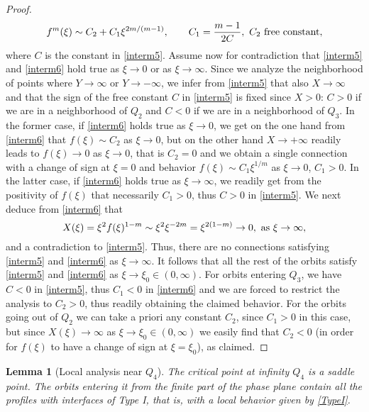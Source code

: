 \documentclass[a4paper,11pt]{article}
\newtheorem{lemma}[theorem]{Lemma}
\numberwithin{equation}{section}
\begin{document}
\begin{proof}
\begin{equation}\label{interm6}
f^m(\xi)\sim C_2+C_1\xi^{2m/(m-1)}, \qquad C_1=\frac{m-1}{2C}, \ C_2 \ {\rm free \ constant},
\end{equation}
where $C$ is the constant in \eqref{interm5}. Assume now for contradiction that \eqref{interm5} and \eqref{interm6} hold true as $\xi\to0$ or as $\xi\to\infty$. Since we analyze the neighborhood of points where $Y\to\infty$ or $Y\to-\infty$, we infer from \eqref{interm5} that also $X\to\infty$ and that the sign of the free constant $C$ in \eqref{interm5} is fixed since $X>0$: $C>0$ if we are in a neighborhood of $Q_2$ and $C<0$ if we are in a neighborhood of $Q_3$. In the former case, if \eqref{interm6} holds true as $\xi\to0$, we get on the one hand from \eqref{interm6} that $f(\xi)\sim C_2$ as $\xi\to0$, but on the other hand $X\to+\infty$ readily leads to $f(\xi)\to0$ as $\xi\to0$, that is $C_2=0$ and we obtain a single connection with a change of sign at $\xi=0$ and behavior $f(\xi)\sim C_1\xi^{1/m}$ as $\xi\to0$, $C_1>0$. In the latter case, if \eqref{interm6} holds true as $\xi\to\infty$, we readily get from the positivity of $f(\xi)$ that necessarily $C_1>0$, thus $C>0$ in \eqref{interm5}. We next deduce from \eqref{interm6} that
$$
X(\xi)=\xi^2f(\xi)^{1-m}\sim\xi^2\xi^{-2m}=\xi^{2(1-m)}\to0, \ {\rm as} \ \xi\to\infty,
$$
and a contradiction to \eqref{interm5}. Thus, there are no connections satisfying \eqref{interm5} and \eqref{interm6} as $\xi\to\infty$. It follows that all the rest of the orbits satisfy \eqref{interm5} and \eqref{interm6} as $\xi\to\xi_0\in(0,\infty)$. For orbits entering $Q_3$, we have $C<0$ in \eqref{interm5}, thus $C_1<0$ in \eqref{interm6} and we are forced to restrict the analysis to $C_2>0$, thus readily obtaining the claimed behavior. For the orbits going out of $Q_2$ we can take a priori any constant $C_2$, since $C_1>0$ in this case, but since $X(\xi)\to\infty$ as $\xi\to\xi_0\in(0,\infty)$ we easily find that $C_2<0$ (in order for $f(\xi)$ to have a change of sign at $\xi=\xi_0$), as claimed.
\end{proof}
\begin{lemma}[Local analysis near $Q_4$]\label{lem.Q4}
The critical point at infinity $Q_4$ is a saddle point. The orbits entering it from the finite part of the phase plane contain all the profiles with interfaces of Type I, that is, with a local behavior given by \eqref{TypeI}.
\end{lemma}
\end{document}
